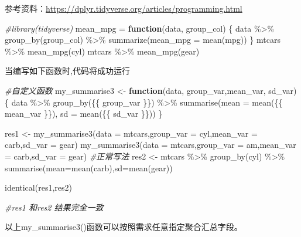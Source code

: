 \documentclass[
]{book}
\newenvironment{Shaded}{\begin{snugshade}}{\end{snugshade}}
\newcommand{\AttributeTok}[1]{\textcolor[rgb]{0.77,0.63,0.00}{#1}}
\newcommand{\CommentTok}[1]{\textcolor[rgb]{0.56,0.35,0.01}{\textit{#1}}}
\newcommand{\ControlFlowTok}[1]{\textcolor[rgb]{0.13,0.29,0.53}{\textbf{#1}}}
\newcommand{\FunctionTok}[1]{\textcolor[rgb]{0.00,0.00,0.00}{#1}}
\newcommand{\NormalTok}[1]{#1}
\newcommand{\OtherTok}[1]{\textcolor[rgb]{0.56,0.35,0.01}{#1}}
\newcommand{\SpecialCharTok}[1]{\textcolor[rgb]{0.00,0.00,0.00}{#1}}
\begin{document}
参考资料：\url{https://dplyr.tidyverse.org/articles/programming.html}

\begin{Shaded}
\begin{Highlighting}[]
\CommentTok{\#library(tidyverse)}
\NormalTok{mean\_mpg }\OtherTok{=} \ControlFlowTok{function}\NormalTok{(data, group\_col) \{}
\NormalTok{  data }\SpecialCharTok{\%\textgreater{}\%} 
    \FunctionTok{group\_by}\NormalTok{(group\_col) }\SpecialCharTok{\%\textgreater{}\%}
    \FunctionTok{summarize}\NormalTok{(}\AttributeTok{mean\_mpg =} \FunctionTok{mean}\NormalTok{(mpg))}
\NormalTok{\}}
\NormalTok{mtcars }\SpecialCharTok{\%\textgreater{}\%} \FunctionTok{mean\_mpg}\NormalTok{(cyl)}
\NormalTok{mtcars }\SpecialCharTok{\%\textgreater{}\%} \FunctionTok{mean\_mpg}\NormalTok{(gear)}
\end{Highlighting}
\end{Shaded}

当编写如下函数时,代码将成功运行

\begin{Shaded}
\begin{Highlighting}[]
\CommentTok{\#自定义函数}
\NormalTok{my\_summarise3 }\OtherTok{\textless{}{-}} \ControlFlowTok{function}\NormalTok{(data, group\_var,mean\_var, sd\_var) \{}
\NormalTok{  data }\SpecialCharTok{\%\textgreater{}\%} 
    \FunctionTok{group\_by}\NormalTok{(\{\{ group\_var \}\}) }\SpecialCharTok{\%\textgreater{}\%} 
    \FunctionTok{summarise}\NormalTok{(}\AttributeTok{mean =} \FunctionTok{mean}\NormalTok{(\{\{ mean\_var \}\}), }\AttributeTok{sd =} \FunctionTok{mean}\NormalTok{(\{\{ sd\_var \}\}))}
\NormalTok{\}}

\NormalTok{res1 }\OtherTok{\textless{}{-}} \FunctionTok{my\_summarise3}\NormalTok{(}\AttributeTok{data =}\NormalTok{ mtcars,}\AttributeTok{group\_var =}\NormalTok{ cyl,}\AttributeTok{mean\_var =}\NormalTok{ carb,}\AttributeTok{sd\_var =}\NormalTok{ gear)}
\FunctionTok{my\_summarise3}\NormalTok{(}\AttributeTok{data =}\NormalTok{ mtcars,}\AttributeTok{group\_var =}\NormalTok{ am,}\AttributeTok{mean\_var =}\NormalTok{ carb,}\AttributeTok{sd\_var =}\NormalTok{ gear)}
\CommentTok{\#正常写法}
\NormalTok{res2 }\OtherTok{\textless{}{-}}\NormalTok{ mtcars }\SpecialCharTok{\%\textgreater{}\%} 
  \FunctionTok{group\_by}\NormalTok{(cyl) }\SpecialCharTok{\%\textgreater{}\%} 
  \FunctionTok{summarise}\NormalTok{(}\AttributeTok{mean=}\FunctionTok{mean}\NormalTok{(carb),}\AttributeTok{sd=}\FunctionTok{mean}\NormalTok{(gear))}

\FunctionTok{identical}\NormalTok{(res1,res2)}

\CommentTok{\#res1 和res2 结果完全一致}
\end{Highlighting}
\end{Shaded}

以上my\_summarise3()函数可以按照需求任意指定聚合汇总字段。

  
\end{document}
